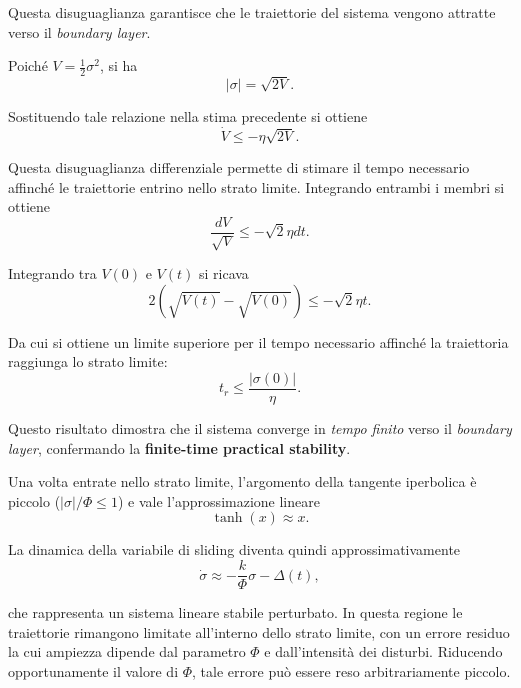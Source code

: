 Questa disuguaglianza garantisce che le traiettorie del sistema vengono attratte verso il \textit{boundary layer}.

Poiché $V=\frac{1}{2}\sigma^2$, si ha
\begin{equation}
|\sigma| = \sqrt{2V}.
\end{equation}

Sostituendo tale relazione nella stima precedente si ottiene
\begin{equation}
\dot{V} \le -\eta \sqrt{2V}.
\end{equation}

Questa disuguaglianza differenziale permette di stimare il tempo necessario affinché le traiettorie entrino nello strato limite. Integrando entrambi i membri si ottiene
\begin{equation}
\frac{dV}{\sqrt{V}} \le -\sqrt{2} \eta dt.
\end{equation}

Integrando tra $V(0)$ e $V(t)$ si ricava
\begin{equation}
2(\sqrt{V(t)}-\sqrt{V(0)}) \le -\sqrt{2}\eta t.
\end{equation}

Da cui si ottiene un limite superiore per il tempo necessario affinché la traiettoria raggiunga lo strato limite:
\begin{equation}
t_r \le \frac{|\sigma(0)|}{\eta}.
\end{equation}

Questo risultato dimostra che il sistema converge in \textit{tempo finito} verso il \textit{boundary layer}, confermando la \textbf{finite-time practical stability}.

Una volta entrate nello strato limite, l'argomento della tangente iperbolica è piccolo ($|\sigma|/\Phi \le 1$) e vale l'approssimazione lineare
\begin{equation}
\tanh(x) \approx x.
\end{equation}

La dinamica della variabile di sliding diventa quindi approssimativamente
\begin{equation}
\dot{\sigma} \approx -\frac{k}{\Phi}\sigma - \Delta(t),
\end{equation}

che rappresenta un sistema lineare stabile perturbato. In questa regione le traiettorie rimangono limitate all'interno dello strato limite, con un errore residuo la cui ampiezza dipende dal parametro $\Phi$ e dall'intensità dei disturbi. Riducendo opportunamente il valore di $\Phi$, tale errore può essere reso arbitrariamente piccolo.


